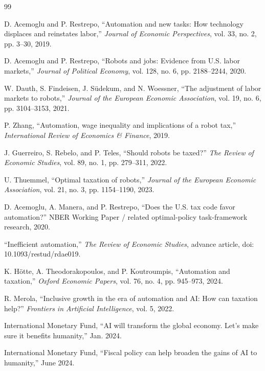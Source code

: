 \documentclass[conference]{IEEEtran}
\begin{document}
\begin{thebibliography}{99}

D. Acemoglu and P. Restrepo,
``Automation and new tasks: How technology displaces and reinstates labor,''
\textit{Journal of Economic Perspectives}, vol. 33, no. 2, pp. 3--30, 2019.

D. Acemoglu and P. Restrepo,
``Robots and jobs: Evidence from U.S. labor markets,''
\textit{Journal of Political Economy}, vol. 128, no. 6, pp. 2188--2244, 2020.

W. Dauth, S. Findeisen, J. S{\"u}dekum, and N. Woessner,
``The adjustment of labor markets to robots,''
\textit{Journal of the European Economic Association},
vol. 19, no. 6, pp. 3104--3153, 2021.

P. Zhang,
``Automation, wage inequality and implications of a robot tax,''
\textit{International Review of Economics \& Finance}, 2019.

J. Guerreiro, S. Rebelo, and P. Teles,
``Should robots be taxed?''
\textit{The Review of Economic Studies}, vol. 89, no. 1,
pp. 279--311, 2022.

U. Thuemmel,
``Optimal taxation of robots,''
\textit{Journal of the European Economic Association},
vol. 21, no. 3, pp. 1154--1190, 2023.

D. Acemoglu, A. Manera, and P. Restrepo,
``Does the U.S. tax code favor automation?''
NBER Working Paper / related optimal-policy task-framework research, 2020.

``Inefficient automation,''
\textit{The Review of Economic Studies}, advance article,
doi: 10.1093/restud/rdae019.

K. H{\"o}tte, A. Theodorakopoulos, and P. Koutroumpis,
``Automation and taxation,''
\textit{Oxford Economic Papers}, vol. 76, no. 4,
pp. 945--973, 2024.

R. Merola,
``Inclusive growth in the era of automation and AI:
How can taxation help?''
\textit{Frontiers in Artificial Intelligence}, vol. 5, 2022.

International Monetary Fund,
``AI will transform the global economy. Let's make sure it benefits humanity,''
Jan. 2024.

International Monetary Fund,
``Fiscal policy can help broaden the gains of AI to humanity,''
June 2024.


\end{thebibliography}
\end{document}
